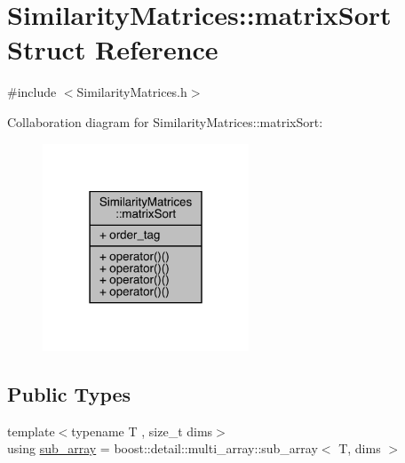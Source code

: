 \hypertarget{struct_similarity_matrices_1_1matrix_sort}{}\section{Similarity\+Matrices\+:\+:matrix\+Sort Struct Reference}
\label{struct_similarity_matrices_1_1matrix_sort}


{\ttfamily \#include $<$Similarity\+Matrices.\+h$>$}



Collaboration diagram for Similarity\+Matrices\+:\+:matrix\+Sort\+:
\nopagebreak
\begin{figure}[H]
\begin{center}
\leavevmode
\includegraphics[width=174pt]{struct_similarity_matrices_1_1matrix_sort__coll__graph}
\end{center}
\end{figure}
\subsection*{Public Types}
\begin{DoxyCompactItemize}
\item 
{\footnotesize template$<$typename T , size\+\_\+t dims$>$ }\\using \mbox{\hyperlink{struct_similarity_matrices_1_1matrix_sort_ae39e66ff77c02f615725350ab7d68f71}{sub\+\_\+array}} = boost\+::detail\+::multi\+\_\+array\+::sub\+\_\+array$<$ T, dims $>$
\end{DoxyCompactItemize}
